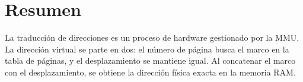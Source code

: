 \documentclass{article}
\begin{document}
\section{Resumen}
\label{sec:orga5c7eda}
La traducción de direcciones es un proceso de hardware gestionado por
la MMU. La dirección virtual se parte en dos: el número de página
busca el marco en la tabla de páginas, y el desplazamiento se mantiene
igual. Al concatenar el marco con el desplazamiento, se obtiene la
dirección física exacta en la memoria RAM.
\end{document}
